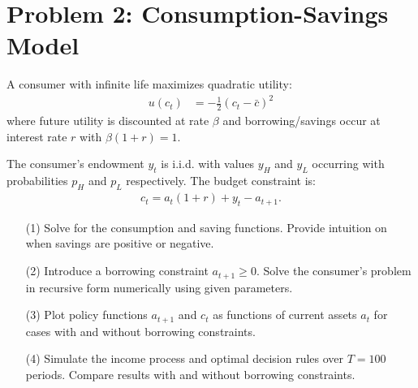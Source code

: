 \documentclass[10pt,a4paper]{article}
\begin{document}
\section*{Problem 2: Consumption-Savings Model}
A consumer with infinite life maximizes quadratic utility:
\begin{align*}
    u(c_t) &= -\frac{1}{2} (c_t - \bar{c})^2
\end{align*}
where future utility is discounted at rate $\beta$ and borrowing/savings occur at interest rate $r$ with $\beta(1+r) = 1$.

The consumer’s endowment $y_t$ is i.i.d. with values $y_H$ and $y_L$ occurring with probabilities $p_H$ and $p_L$ respectively. The budget constraint is:
\begin{align*}
    c_t = a_t(1+r) + y_t - a_{t+1}.
\end{align*}

\begin{enumerate}
    \item[(1)] Solve for the consumption and saving functions. Provide intuition on when savings are positive or negative.
    \item[(2)] Introduce a borrowing constraint $a_{t+1} \geq 0$. Solve the consumer’s problem in recursive form numerically using given parameters.
    \item[(3)] Plot policy functions $a_{t+1}$ and $c_t$ as functions of current assets $a_t$ for cases with and without borrowing constraints.
    \item[(4)] Simulate the income process and optimal decision rules over $T=100$ periods. Compare results with and without borrowing constraints.
\end{enumerate}
\end{document}
